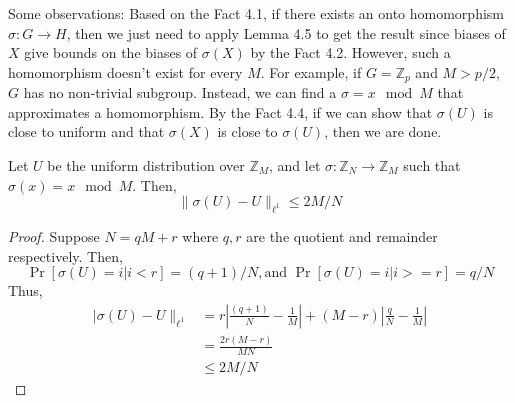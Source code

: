 Some observations: Based on the Fact 4.1, if there exists an onto homomorphism $\sigma: G \rightarrow H$, then we just need to apply Lemma 4.5 to get the result since biases of $X$ give bounds on the biases of $\sigma(X)$ by the Fact 4.2. However, such a homomorphism doesn't exist for every $M$. For example, if $G= \mathbb{Z}_p$ and $M > p/2$, $G$ has no non-trivial subgroup. Instead, we can find a $\sigma = x \mod M$ that approximates a homomorphism. By the Fact 4.4, if we can show that $\sigma(U)$ is close to uniform and that $\sigma(X)$ is close to $\sigma(U)$, then we are done. 

\begin{lemma} Let $U$ be the uniform distribution over $\mathbb{Z}_M$, and let $\sigma : \mathbb{Z}_N \rightarrow \mathbb{Z}_M $ such that $\sigma(x) = x \mod M$. Then,
$$\| \sigma(U) - U \|_{\ell^1} \leq 2M/N$$
\end{lemma}

\begin{proof}
Suppose $N = qM + r$ where $q,r$ are the quotient and remainder respectively. Then,
$$\Pr[\sigma(U) = i | i < r] = (q+1)/N, \text{and }
\Pr[\sigma(U) = i | i >= r] = q/N$$
Thus, 
\begin{align*}
| \sigma(U) - U \|_{\ell^1} 
&= r \left|\frac{(q+1)}{N} - \frac{1}{M}\right| + (M-r) \left|\frac{q}{N} - \frac{1}{M}\right| \\
&= \frac{2r(M-r)}{MN} \\
&\leq 2M/N
\end{align*}
\end{proof}


